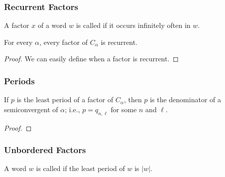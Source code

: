 \subsubsection{Recurrent Factors}

\begin{definition}
    A factor $x$ of a word $w$ is called  if it occurs infinitely often in $w$.
\end{definition}

\begin{theorem}
    For every $\alpha$, every factor of $C_{\alpha}$ is recurrent.
\end{theorem}
\begin{proof}
    We can easily define when a factor is recurrent.
\end{proof}

\subsubsection{Periods}

\begin{theorem}\label{thm:lesat-period-semiconvergent}
    If $p$ is the least period of a factor of $C_{\alpha}$, then $p$ is the denominator of a semiconvergent of $\alpha$; i.e., $p = q_{n,\ell}$ for some $n$ and $\ell$.
\end{theorem}
\begin{proof}
\end{proof}

\subsubsection{Unbordered Factors}

\begin{definition}
    A word $w$ is called  if the least period of $w$ is $|w|$.
\end{definition}



